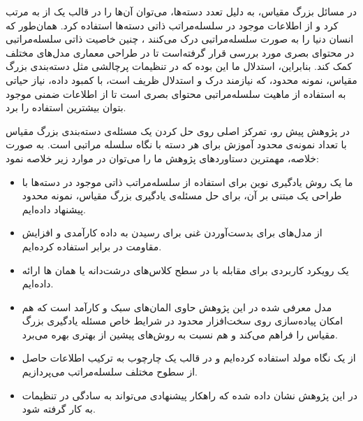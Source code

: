 در مسائل بزرگ مقیاس، به دلیل تعدد دسته‌ها، می‌توان آن‌ها را در قالب یک
 از 
به 
مرتب کرد و از اطلاعات موجود در سلسله‌مراتب ذاتی دسته‌ها استفاده کرد. همان‌طور که انسان دنیا را به صورت سلسله‌مراتبی درک می‌کنند
\cite{Hubel1968ReceptiveFA,Fukushima1980NeocognitronAS,Kuzovkin2017ActivationsOD}
، چنین خاصیت ذاتی سلسله‌مراتبی در محتوای بصری مورد بررسی قرار گرفته‌است تا در طراحی معماری مدل‌های مختلف کمک کند. 
بنابراین، استدلال ما این بوده که در تنظیمات پرچالشی مثل دسته‌بندی بزرگ مقیاس، نمونه محدود، که نیازمند درک و استدلال ظریف است، با کمبود داده، نیاز حیاتی به استفاده از ماهیت سلسله‌مراتبی محتوای بصری است تا از اطلاعات ضمنی موجود بتوان بیشترین استفاده را برد.

در پژوهش پیش رو، تمرکز اصلی روی حل کردن یک مسئله‌ی دسته‌بندی بزرگ مقیاس با تعداد نمونه‌ی محدود آموزش برای هر دسته با نگاه سلسله مراتبی است.
به صورت خلاصه، مهمترین دستاوردهای پژوهش ما را می‌توان در موارد زیر خلاصه نمود:

\begin{itemize}
\item 
ما یک روش یادگیری نوین برای استفاده از سلسله‌مراتب ذاتی موجود در دسته‌ها با طراحی یک
مبتنی بر آن،‌ برای حل مسئله‌ی یادگیری بزرگ مقیاس، نمونه محدود پیشنهاد داده‌ایم.
\item
از مدل‌های 
برای بدست‌آوردن 
غنی برای رسیدن به داده کارآمدی و افزایش مقاومت در برابر 
استفاده کرده‌ایم.

\item
یک رویکرد کاربردی برای مقابله با 
در سطح کلاس‌های درشت‌دانه یا همان 
ها ارائه داده‌ایم.
\item
مدل معرفی شده در این پژوهش حاوی المان‌های سبک و کارآمد است که هم امکان پیاده‌سازی روی سخت‌افزار محدود در شرایط خاص مسئله یادگیری بزرگ مقیاس را فراهم می‌کند و هم نسبت به روش‌های پیشین از 
 بهتری بهره می‌برد.
\item
از یک نگاه مولد استفاده کرده‌ایم و در قالب یک چارچوب 
به ترکیب اطلاعات حاصل از سطوح مختلف سلسله‌مراتب می‌پردازیم.
\item 
در این پژوهش نشان داده شده که راهکار پیشنهادی می‌تواند به سادگی در تنظیمات 
 به کار گرفته شود.
\end{itemize}

